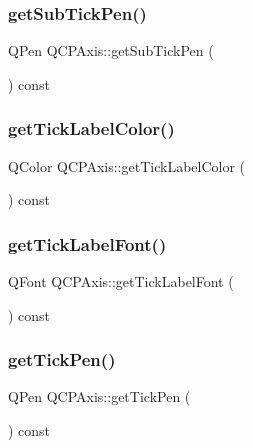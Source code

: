 \subsubsection{\texorpdfstring{getSubTickPen()}{getSubTickPen()}}
{\footnotesize\ttfamily Q\+Pen Q\+C\+P\+Axis\+::get\+Sub\+Tick\+Pen (\begin{DoxyParamCaption}{ }\end{DoxyParamCaption}) const\hspace{0.3cm}{\ttfamily [protected]}}

\mbox{\label{class_q_c_p_axis_a8d00d5b78ecfbebbea5a8161bddb9a17}} 
\subsubsection{\texorpdfstring{getTickLabelColor()}{getTickLabelColor()}}
{\footnotesize\ttfamily Q\+Color Q\+C\+P\+Axis\+::get\+Tick\+Label\+Color (\begin{DoxyParamCaption}{ }\end{DoxyParamCaption}) const\hspace{0.3cm}{\ttfamily [protected]}}

\mbox{\label{class_q_c_p_axis_a694ab8b4240f3c90a866372e3dcb364f}} 
\subsubsection{\texorpdfstring{getTickLabelFont()}{getTickLabelFont()}}
{\footnotesize\ttfamily Q\+Font Q\+C\+P\+Axis\+::get\+Tick\+Label\+Font (\begin{DoxyParamCaption}{ }\end{DoxyParamCaption}) const\hspace{0.3cm}{\ttfamily [protected]}}

\mbox{\label{class_q_c_p_axis_afe7d57415cbbf31e5549a5cc40b6f8d8}} 
\subsubsection{\texorpdfstring{getTickPen()}{getTickPen()}}
{\footnotesize\ttfamily Q\+Pen Q\+C\+P\+Axis\+::get\+Tick\+Pen (\begin{DoxyParamCaption}{ }\end{DoxyParamCaption}) const\hspace{0.3cm}{\ttfamily [protected]}}

